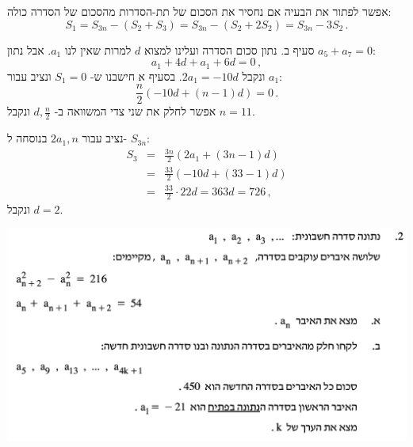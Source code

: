 \documentclass[12pt,a4paper]{article}
\begin{document}
אפשר לפתור את הבעיה אם נחסיר את הסכום של תת-הסדרות מהסכום של הסדרה כולה:
\[
S_1 = S_{3n} - (S_2+S_3) =  S_{3n} - (S_2 + 2S_2) = S_{3n} - 3S_2\,.
\]
\hspace*{1.5em}
\par
סעיף ב. נתון סכום הסדרה ועלינו למצוא
$d$
למרות שאין לנו 
$a_1$.
אבל נתון
$a_5+a_7=0$:
\[
a_1 + 4d + a_1 + 6d = 0\,,
\]
ונקבל
$2a_1=-10d$.
בסעיף א חישבנו ש-%
$S_1=0$
ונציב עבור 
$a_1$:
\[
\frac{n}{2}(-10d+(n-1)d)=0\,.
\]
אפשר לחלק את שני צדי המשוואה ב-%
$d,\frac{n}{2}$
ונקבל
$n=11$.

נציב עבור
$2a_1,n$
בנוסחה ל-%
$S_{3n}$:
\begin{eqnarray*}
S_3&=&\frac{3n}{2}(2a_1+(3n-1)d)\\
&=&\frac{33}{2}(-10d+(33-1)d)\\
&=&\frac{33}{2}\cdot 22d = 363d=726\,,
\end{eqnarray*}
ונקבל 
$d=2$.

\bigskip

\textbf{}

\begin{center}
\includegraphics[width=.95\textwidth]{summer-2014b-2}
\end{center}
\vspace{-2ex}
\end{document}

